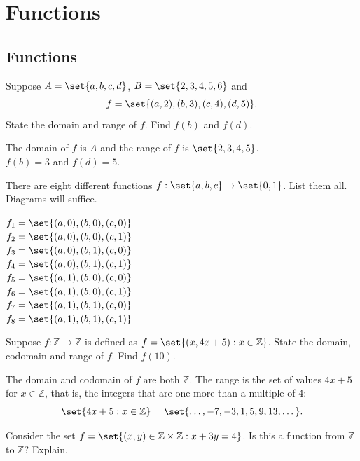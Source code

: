 \documentclass[DIN, pagenumber=false, fontsize=11pt, parskip=half]{scrartcl}
\title{}
\author{} %
\date{}
\begin{document}
\maketitle

\setcounter{section}{11}

\section{Functions}

\subsection{Functions}

\begin{problems}
    \problem Suppose $A = \set{a,b,c,d}$, $B = \set{2,3,4,5,6}$ and
    \[
        f = \set{(a,2),(b,3),(c,4),(d,5)}.
    \]
    State the domain and range of $f$. Find $f(b)$ and $f(d)$.

    \answer The domain of $f$ is $A$ and the range of $f$ is $\set{2,3,4,5}$.\\ 
    $f(b) = 3$ and $f(d) = 5$.

    \problem There are eight different functions $f : \set{a,b,c} \to \set{0,1}$. List them all. Diagrams will suffice.

    \answer $f_1 = \set{(a,0),(b,0),(c,0)}$\\ 
    $f_2 = \set{(a,0),(b,0),(c,1)}$\\ 
    $f_3 = \set{(a,0),(b,1),(c,0)}$\\ 
    $f_4 = \set{(a,0),(b,1),(c,1)}$\\ 
    $f_5 = \set{(a,1),(b,0),(c,0)}$\\ 
    $f_6 = \set{(a,1),(b,0),(c,1)}$\\ 
    $f_7 = \set{(a,1),(b,1),(c,0)}$\\ 
    $f_8 = \set{(a,1),(b,1),(c,1)}$

    \problem Suppose $f : \mathbb{Z} \to \mathbb{Z}$ is defined as $f = \set{(x, 4x+5) : x \in \mathbb{Z}}$. State the domain, codomain and range of $f$. Find $f(10)$.

    \answer The domain and codomain of $f$ are both $\mathbb{Z}$. The range is the set of values $4x+5$ for $x \in \mathbb{Z}$, that is, the integers that are one more than a multiple of 4:
    \[
        \set{4x+5 : x \in \mathbb{Z}} = \set{\dots,-7,-3,1,5,9,13,\dots}.
    \]

    \problem Consider the set $f = \set{(x,y) \in \mathbb{Z} \times \mathbb{Z} : x + 3y = 4}$. Is this a function from $\mathbb{Z}$ to $\mathbb{Z}$? Explain.


\end{problems}
\end{document}
